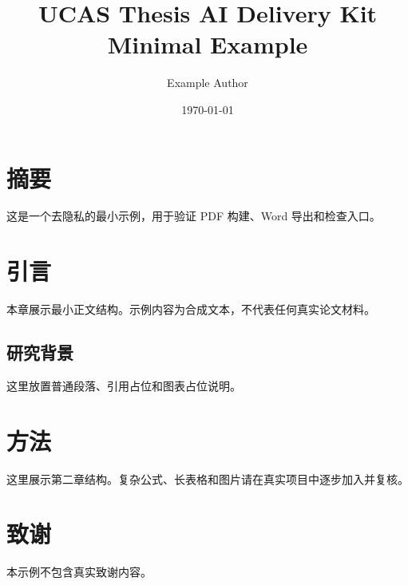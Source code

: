\documentclass[UTF8,a4paper,12pt]{ctexbook}
\title{UCAS Thesis AI Delivery Kit Minimal Example}
\author{Example Author}
\date{\today}
\begin{document}
\frontmatter
\maketitle

\chapter*{摘要}
这是一个去隐私的最小示例，用于验证 PDF 构建、Word 导出和检查入口。

\tableofcontents

\mainmatter
\chapter{引言}
本章展示最小正文结构。示例内容为合成文本，不代表任何真实论文材料。

\section{研究背景}
这里放置普通段落、引用占位和图表占位说明。

\chapter{方法}
这里展示第二章结构。复杂公式、长表格和图片请在真实项目中逐步加入并复核。

\backmatter
\chapter*{致谢}
本示例不包含真实致谢内容。
\end{document}
